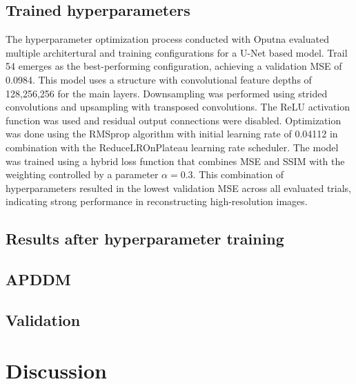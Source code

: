 \documentclass[twocolumn]{article}
\begin{document}
\subsection{Trained hyperparameters}
The hyperparameter optimization process conducted with Oputna evaluated multiple architertural and training configurations for a U-Net based model. 
Trail 54 emerges as the best-performing configuration, achieving a validation MSE of 0.0984. 
This model uses a structure with convolutional feature depths of 128,256,256 for the main layers. 
Downsampling was performed using strided convolutions and upsampling with transposed convolutions. 
The ReLU activation function was used and residual output connections were disabled. 
Optimization was done using the RMSprop algorithm with initial learning rate of 0.04112 in combination with the ReduceLROnPlateau learning rate scheduler. 
The model was trained using a hybrid loss function that combines MSE and SSIM with the weighting controlled by a parameter $\alpha=0.3$.
This combination of hyperparameters resulted in the lowest validation MSE across all evaluated trials, indicating strong performance in reconstructing high-resolution images. 

\subsection{Results after hyperparameter training}

\subsection{APDDM}

\subsection{Validation}

\section{Discussion}
\end{document}
